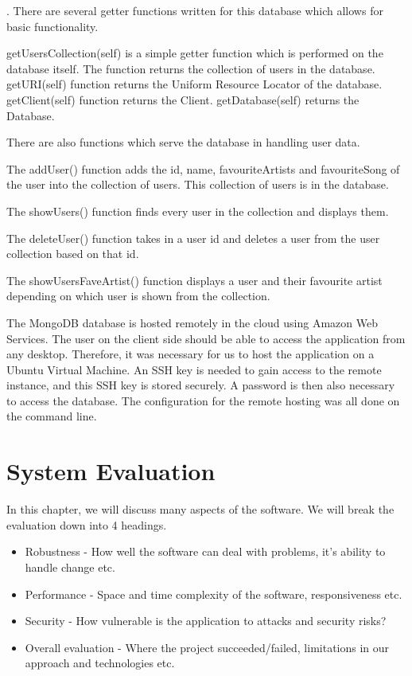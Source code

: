 . There are several getter functions written for this database which allows for basic functionality.

getUsersCollection(self) is a simple getter function which is performed on the database itself. The function returns the collection of users in the database.
getURI(self) function returns the Uniform Resource Locator of the database.
getClient(self) function returns the Client.
getDatabase(self) returns the Database.

There are also functions which serve the database in handling user data.

The addUser() function adds the id, name, favouriteArtists and favouriteSong of the user into the collection of users. This collection of users is in the database.

The showUsers() function finds every user in the collection and displays them.

The deleteUser() function takes in a user id and deletes a user from the user collection based on that id.

The showUsersFaveArtist() function displays a user and their favourite artist depending on which user is shown from the collection.

The MongoDB database is hosted remotely in the cloud using Amazon Web Services. The user on the client side should be able to access the application from any desktop. Therefore, it was necessary for us to host the application on a Ubuntu Virtual Machine. An SSH key is needed to gain access to the remote instance, and this SSH key is stored securely. A password is then also necessary to access the database. The configuration for the remote hosting was all done on the command line.


\chapter{System Evaluation}
In this chapter, we will discuss many aspects of the software. We will break the evaluation down into 4 headings.
\begin{itemize}
  \item Robustness - How well the software can deal with problems, it's ability to handle change etc.
  \item Performance - Space and time complexity of the software, responsiveness etc.
  \item Security - How vulnerable is the application to attacks and security risks?
  \item Overall evaluation - Where the project succeeded/failed, limitations in our approach and technologies etc.
  \end{itemize}

